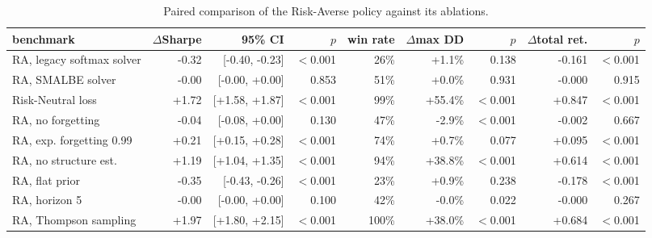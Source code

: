 \begin{table}[ht!]
\centering
\footnotesize
\setlength{\tabcolsep}{4pt}
\begin{tabular}{lrrrrrrrr}
\hline
benchmark & $\Delta$Sharpe & 95\% CI & $p$ & win rate & $\Delta$max DD & $p$ & $\Delta$total ret. & $p$ \\
\hline
RA, legacy softmax solver & -0.32 & [-0.40, -0.23] & $<$0.001 & 26\% & +1.1\% & 0.138 & -0.161 & $<$0.001 \\
RA, SMALBE solver & -0.00 & [-0.00, +0.00] & 0.853 & 51\% & +0.0\% & 0.931 & -0.000 & 0.915 \\
Risk-Neutral loss & +1.72 & [+1.58, +1.87] & $<$0.001 & 99\% & +55.4\% & $<$0.001 & +0.847 & $<$0.001 \\
RA, no forgetting & -0.04 & [-0.08, +0.00] & 0.130 & 47\% & -2.9\% & $<$0.001 & -0.002 & 0.667 \\
RA, exp. forgetting 0.99 & +0.21 & [+0.15, +0.28] & $<$0.001 & 74\% & +0.7\% & 0.077 & +0.095 & $<$0.001 \\
RA, no structure est. & +1.19 & [+1.04, +1.35] & $<$0.001 & 94\% & +38.8\% & $<$0.001 & +0.614 & $<$0.001 \\
RA, flat prior & -0.35 & [-0.43, -0.26] & $<$0.001 & 23\% & +0.9\% & 0.238 & -0.178 & $<$0.001 \\
RA, horizon 5 & -0.00 & [-0.00, +0.00] & 0.100 & 42\% & -0.0\% & 0.022 & -0.000 & 0.267 \\
RA, Thompson sampling & +1.97 & [+1.80, +2.15] & $<$0.001 & 100\% & +38.0\% & $<$0.001 & +0.684 & $<$0.001 \\
\hline
\end{tabular}
\caption{Paired comparison of the Risk-Averse policy against its ablations.}
\label{tab:ablation_paired}
\end{table}
